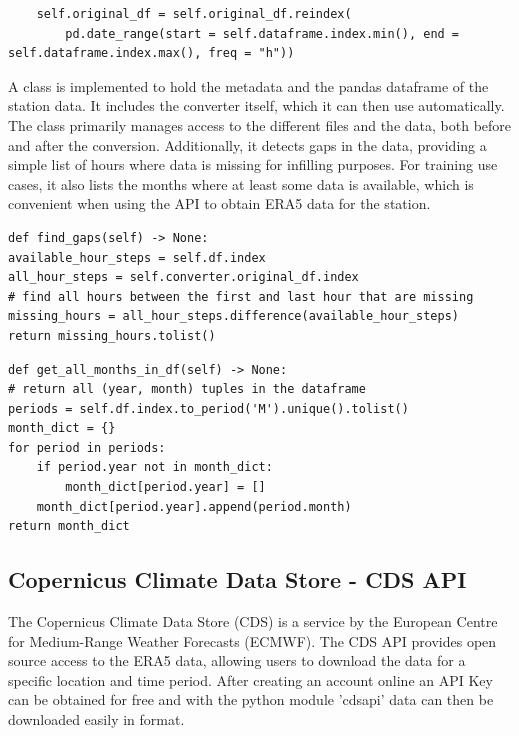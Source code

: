 \begin{lstlisting}
    self.original_df = self.original_df.reindex(
        pd.date_range(start = self.dataframe.index.min(), end = self.dataframe.index.max(), freq = "h"))
\end{lstlisting}

A class  is implemented to hold the metadata and the pandas dataframe of the station data.
It includes the converter itself, which it can then use automatically.
The class primarily manages access to the different files and the data, both before and after the conversion.
Additionally, it detects gaps in the data, providing a simple list of hours where data is missing for infilling purposes.
For training use cases, it also lists the months where at least some data is available, which is convenient when using the API to obtain ERA5 data for the station.

\begin{lstlisting}[caption=Gap Detection in Station Class, label=lst: find_gaps]
def find_gaps(self) -> None:
available_hour_steps = self.df.index
all_hour_steps = self.converter.original_df.index
# find all hours between the first and last hour that are missing
missing_hours = all_hour_steps.difference(available_hour_steps)
return missing_hours.tolist()
\end{lstlisting}

\begin{lstlisting}[caption=Detection of available ranges in Station Class, label=lst: available_ranges]
def get_all_months_in_df(self) -> None:
# return all (year, month) tuples in the dataframe
periods = self.df.index.to_period('M').unique().tolist()
month_dict = {}
for period in periods:
    if period.year not in month_dict:
        month_dict[period.year] = []
    month_dict[period.year].append(period.month)
return month_dict
\end{lstlisting}

\subsection{Copernicus Climate Data Store - CDS API}
\label{sec: cds_api}

The Copernicus Climate Data Store (CDS) is a service by the European Centre for Medium-Range Weather Forecasts (ECMWF).
The CDS API provides open source access to the ERA5 data, allowing users to download the data for a specific location and time period.
After creating an account online an API Key can be obtained for free and with the python module 'cdsapi' data can then be downloaded easily in  format. 

